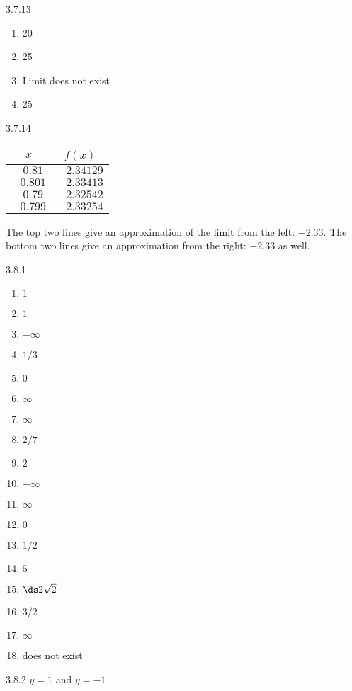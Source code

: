 \begin{Answer}{3.7.13}
{\begin{enumerate}
\item		20
\item		25
\item		Limit does not exist
\item		25
\end{enumerate}
}

\end{Answer}
\begin{Answer}{3.7.14}


{\begin{tabular}{cc}
$x$ & $f(x)$ \\ \hline
$-0.81 $& $-2.34129$ \\
$ -0.801$ & $-2.33413$ \\
$ -0.79 $& $-2.32542 $\\
$ -0.799$ & $-2.33254$
\end{tabular}

The top two lines give an approximation of the limit from the left: $-2.33$. The bottom two lines give an approximation from the right: $-2.33$ as well.
}
\end{Answer}
\begin{Answer}{3.8.1}
\begin{multicols}{3}
\begin{enumerate}
	\item	$1$
	\item	$1$
	\item	$-\infty$
	\item	$1/3$
	\item	$0$
	\item	$\infty$
	\item	$\infty$
	\item	$2/7$
	\item	$2$
	\item	$-\infty$
	\item	$\infty$
	\item	$0$
	\item	$1/2$
	\item	$5$
	\item	$\ds 2\sqrt2$
	\item	$3/2$
	\item	$\infty$
	\item	does not exist
\end{enumerate}
\end{multicols}
\end{Answer}
\begin{Answer}{3.8.2}
$y=1$ and $y=-1$
\end{Answer}
